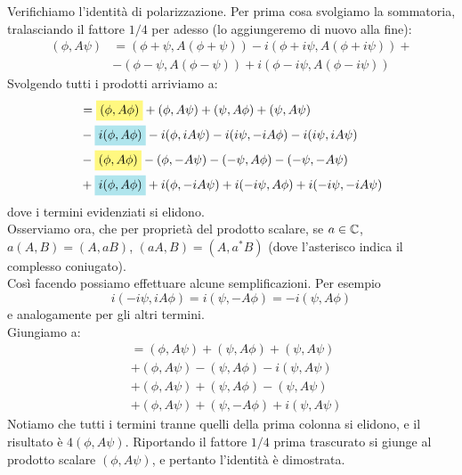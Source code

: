 \documentclass[FisicaTeorica.tex]{subfiles}
\begin{document}
	\begin{expl}
	Verifichiamo l'identità di polarizzazione. Per prima cosa svolgiamo la sommatoria, tralasciando il fattore $1/4$ per adesso (lo aggiungeremo di nuovo alla fine):
	\begin{align*}
	    (\phi, A\psi) &= (\phi+\psi, A(\phi +\psi))-i(\phi+i\psi, A(\phi+i\psi))+\\
	    & -(\phi-\psi, A(\phi-\psi)) +i(\phi-i\psi,A(\phi-i\psi))
	\end{align*}
	Svolgendo tutti i prodotti arriviamo a:
	\begin{align*}
	    &= \hlc{Yellow}{(\phi,A\phi)} + (\phi,A\psi) + (\psi,A\phi) + (\psi,A\psi)\\
	    &- \hlc{SkyBlue}{i(\phi,A\phi)} -i(\phi, iA\psi) -i(i\psi, -iA\phi) -i(i\psi, iA\psi)\\
	    &- \hlc{Yellow}{(\phi,A\phi)}  -(\phi, -A\psi) -(-\psi, A\phi) -(-\psi, -A\psi)\\
	    &+ \hlc{SkyBlue}{i(\phi, A\phi)} + i(\phi, -iA\psi) +i(-i\psi, A\phi) + i(-i\psi, -iA\psi)
	\end{align*}
	dove i termini evidenziati si elidono.\\
	Osserviamo ora, che per proprietà del prodotto scalare, se $a\in \mathbb{C}$, $a(A,B) = (A,aB)$, $(aA,B) = (A, a^* B)$ (dove l'asterisco indica il complesso coniugato).\\
	Così facendo possiamo effettuare alcune semplificazioni. Per esempio
	\[ i(-i\psi, iA\phi) = i(\psi,-A\phi) = -i(\psi,A\phi) \]
	e analogamente per gli altri termini.\\
	Giungiamo a:
	\begin{align*}
	    &= (\phi,A\psi)+(\psi, A\phi)+(\psi, A\psi)\\
	    &+ (\phi, A\psi) -(\psi,A\phi) -i(\psi,A\psi)\\
	    &+ (\phi, A\psi) +(\psi,A\phi) -(\psi, A\psi)\\
	    &+ (\phi, A\psi) + (\psi, -A\phi) +i(\psi,A\psi)
	\end{align*}
	Notiamo che tutti i termini tranne quelli della prima colonna si elidono, e il risultato è $4(\phi, A\psi)$. Riportando il fattore $1/4$ prima trascurato si giunge al prodotto scalare $(\phi, A\psi)$, e pertanto l'identità è dimostrata.
	\end{expl}
\end{document}
